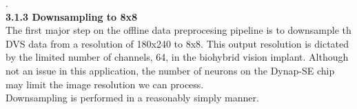 \documentclass[8pt]{beamer}
\begin{document}
\begin{small}
\begin{frame}
		\hspace{2.7cm}
	\end{frame}

	\tiny .\\
	\small
	\selectfont
	\hspace{.2cm} \textbf{3.1.3 Downsampling to 8x8} \\ 
	The first major step on the offline data preprocesing pipeline is to
	downsample th DVS data from a resolution of 180x240 to 8x8. This output
	resolution is dictated by the limited number of channels, 64, in the
	biohybrid vision implant. Although not an issue in this application, the
	number of neurons on the Dynap-SE chip may limit the image resolution we can
	process. \\ \vspace{.1cm}
	Downsampling is performed in a reasonably simply manner. 


\end{small}
\end{document}
